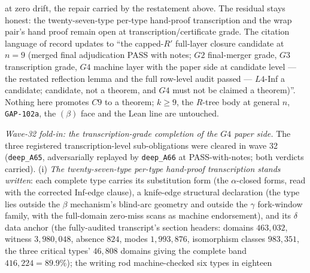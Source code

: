 at zero drift, the repair carried by the restatement above. The residual
stays honest: the twenty-seven-type per-type hand-proof transcription and
the wrap pair's hand proof remain open at transcription/certificate
grade. The citation language of record updates to ``the capped-$R'$
full-layer closure candidate at $n=9$ (merged final adjudication PASS
with notes; $G2$ final-merger grade, $G3$ transcription grade, $G4$
machine layer with the paper side at candidate level --- the restated
reflection lemma and the full row-level audit passed --- $L4$-Inf a
candidate; candidate, not a theorem, and $G4$ must not be claimed a
theorem)''. Nothing here promotes $C9$ to a theorem; $k\ge9$, the
$R$-tree body at general $n$, \texttt{GAP-102a}, the $(\beta)$ face and
the Lean line are untouched.

\emph{Wave-32 fold-in: the transcription-grade completion of the $G4$ paper
side.} The three registered transcription-level sub-obligations were
cleared in wave 32 (\texttt{deep\_A65}, adversarially replayed by
\texttt{deep\_A66} at PASS-with-notes; both verdicts carried).
\textup{(i)} \emph{The twenty-seven-type per-type hand-proof
transcription stands written}: each complete type carries its substitution
form (the $\alpha$-closed forms, read with the corrected Inf-edge clause),
a knife-edge structural declaration (the type lies outside the
$\beta$ mechanism's blind-arc geometry and outside the $\gamma$
fork-window family, with the full-domain zero-miss scans as machine
endorsement), and its $\delta$ data anchor (the fully-audited transcript's
section headers: domains $463{,}032$, witness $3{,}980{,}048$, absence
$824$, modes $1{,}993{,}876$, isomorphism classes $983{,}351$, the three
critical types' $46{,}808$ domains giving the complete band
$416{,}224=89.9\%$); the writing rod machine-checked six types in eighteen

